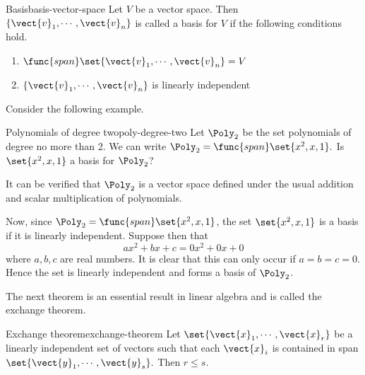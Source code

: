 \begin{definition}{Basis}{basis-vector-space}
Let $V$ be a vector space. Then $\{\vect{v}_{1},\cdots ,\vect{v}_{n}\}$ is called a basis for $V$ if the following conditions hold.
\begin{enumerate}
\item
$\func{span}\set{\vect{v}_{1},\cdots ,\vect{v}_{n}} = V$
\item
$\{\vect{v}_{1},\cdots ,\vect{v}_{n}\}$ is linearly independent
\end{enumerate}
\end{definition}

Consider the following example.

\begin{example}{Polynomials of degree two}{poly-degree-two}
Let $\Poly_2$ be the set polynomials of degree no more than 2. We can write
$\Poly_2=\func{span}\set{x^{2}, x, 1} .$ Is $\set{x^{2}, x, 1} $ a
basis for $\Poly_2$?
\end{example}

\begin{solution}
It can be verified that $\Poly_2$ is a vector space defined under the usual addition and scalar multiplication of polynomials. 

Now, since $\Poly_2=\func{span}\set{x^{2},x, 1}$, the set  $\set{x^{2}, x, 1} $ is a basis if it is linearly independent. Suppose then that 
\begin{equation*}
ax^{2}+bx+c=0x^2 + 0x + 0 
\end{equation*}
where $a,b,c$ are real numbers. It is clear that this can only occur if $a=b=c=0$. Hence the set is linearly independent and forms a basis of $\Poly_2$.
\end{solution}

The next theorem is an essential result in linear algebra and is called the exchange theorem.

\begin{theorem}{Exchange theorem}{exchange-theorem}
Let $\set{\vect{x}_{1},\cdots ,\vect{x}_{r}} $
be a linearly independent set of vectors such that each $\vect{x}_{i}$ is
contained in span$\set{\vect{y}_{1},\cdots ,\vect{y}_{s}} .$ Then $
r\leq s.$
\end{theorem}


